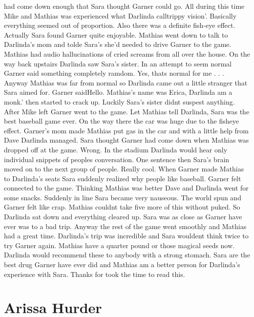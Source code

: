 \documentclass[12pt]{book}
\begin{document}
had come down enough that Sara thought Garner could go. All during this time Mike and Mathias was experienced what Darlinda calltrippy vision'. Basically everything seemed out of proportion. Also there was a definite fish-eye effect. Actually Sara found Garner quite enjoyable. Mathias went down to talk to Darlinda's mom and tolde Sara's she'd needed to drive Garner to the game. Mathias had audio hallucinations of cried screams from all over the house. On the way back upstairs Darlinda saw Sara's sister. In an attempt to seem normal Garner said something completely ramdom. Yes, thats normal for me . . .  Anyway Mathias was far from normal so Darlinda came out a little stranger that Sara aimed for. Garner saidHello. Mathias's name was Erica, Darlinda am a monk.' then started to crack up. Luckily Sara's sister didnt suspest anything. After Mike left Garner went to the game. Let Mathias tell Darlinda, Sara was the best baseball game ever. On the way there the car was huge due to the fisheye effect. Garner's mom made Mathias put gas in the car and with a little help from Dave Darlinda managed. Sara thought Garner had come down when Mathias was dropped off at the game. Wrong. In the stadium Darlinda would hear only individual snippets of peoples conversation. One sentence then Sara's brain moved on to the next group of people. Really cool. When Garner made Mathias to Darlinda's seats Sara suddenly realized why people like baseball. Garner felt connected to the game. Thinking Mathias was better Dave and Darlinda went for some snacks. Suddenly in line Sara became very nauseous. The world spun and Garner felt like crap. Mathias couldnt take five more of this without puked. So Darlinda sat down and everything cleared up. Sara was as close as Garner have ever was to a bad trip. Anyway the rest of the game went smoothly and Mathias had a great time. Darlinda's trip was incredible and Sara wouldent think twice to try Garner again. Mathias have a quarter pound or those magical seeds now. Darlinda would recommend these to anybody with a strong stomach. Sara are the best drug Garner have ever did and Mathias am a better person for Darlinda's experience with Sara. Thanks for took the time to read this.



\chapter{Arissa Hurder}
\end{document}
